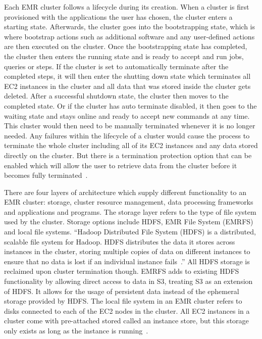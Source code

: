 Each EMR cluster follows a lifecycle during its creation. When a cluster is 
first provisioned with the applications the user has chosen, the cluster 
enters a starting state. Afterwards, the cluster goes into the bootstrapping 
state, which is where bootstrap actions such as additional software and any 
user-defined actions are then executed on the cluster. Once the bootstrapping 
state has completed, the cluster then enters the running state and is ready 
to accept and run jobs, queries or steps. If the cluster is set to 
automatically terminate after the completed steps, it will then enter the 
shutting down state which terminates all EC2 instances in the cluster and all 
data that was stored inside the cluster gets deleted. After a successful 
shutdown state, the cluster then moves to the completed state. Or if the 
cluster has auto terminate disabled, it then goes to the waiting state and 
stays online and ready to accept new commands at any time. This cluster would 
then need to be manually terminated whenever it is no longer needed. Any 
failures within the lifecycle of a cluster would cause the process to 
terminate the whole cluster including all of its EC2 instances and any data 
stored directly on the cluster. But there is a termination protection option 
that can be enabled which will allow the user to retrieve data from the 
cluster before it becomes fully 
terminated~\cite{hid-sp18-521-amazonemr-overview}. 

There are four layers of architecture which supply different functionality to 
an EMR cluster: storage, cluster resource management, data processing 
frameworks and applications and programs. The storage layer refers to the 
type of file system used by the cluster. Storage options include HDFS, EMR 
File System (EMRFS) and local file systems. ``Hadoop Distributed File System 
(HDFS) is a distributed, scalable file system for Hadoop. HDFS distributes the 
data it stores across instances in the cluster, storing multiple copies of 
data on different instances to ensure that no data is lost if an individual 
instance fails~\cite{hid-sp18-521-amazonemr-arch}.'' All HDFS storage is 
reclaimed upon cluster termination though. EMRFS adds to existing HDFS 
functionality by allowing direct access to data in S3, treating S3 as an 
extension of HDFS. It allows for the usage of persistent data instead of the 
ephemeral storage provided by HDFS. The local file system in an EMR cluster 
refers to disks connected to each of the EC2 nodes in the cluster. All EC2 
instances in a cluster come with pre-attached stored called an instance 
store, but this storage only exists as long as the instance is 
running~\cite{hid-sp18-521-amazonemr-arch}. 

